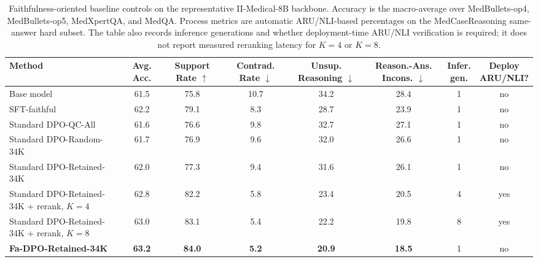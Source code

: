\documentclass[a4paper,fleqn,doubleblind]{cas-sc}
\begin{document}
\begin{table}[htbp]
    \centering
    \footnotesize
    \setlength{\tabcolsep}{3.2pt}
    \caption{Faithfulness-oriented baseline controls on the representative II-Medical-8B backbone. Accuracy is the macro-average over MedBullets-op4, MedBullets-op5, MedXpertQA, and MedQA. Process metrics are automatic ARU/NLI-based percentages on the MedCaseReasoning same-answer hard subset. The table also records inference generations and whether deployment-time ARU/NLI verification is required; it does not report measured reranking latency for $K=4$ or $K=8$.}
    \label{tab:faithfulness_baseline_results}
    \begin{adjustbox}{max width=\textwidth}
    \begin{tabular}{lccccccc}
        \toprule
        \textbf{Method} & \textbf{Avg. Acc.} & \shortstack[c]{\textbf{Support}\\\textbf{Rate $\uparrow$}} & \shortstack[c]{\textbf{Contrad.}\\\textbf{Rate $\downarrow$}} & \shortstack[c]{\textbf{Unsup.}\\\textbf{Reasoning $\downarrow$}} & \shortstack[c]{\textbf{Reason.-Ans.}\\\textbf{Incons. $\downarrow$}} & \shortstack[c]{\textbf{Infer.}\\\textbf{gen.}} & \shortstack[c]{\textbf{Deploy}\\\textbf{ARU/NLI?}} \\
        \midrule
        Base model & 61.5 & 75.8 & 10.7 & 34.2 & 28.4 & 1 & no \\
        SFT-faithful & 62.2 & 79.1 & 8.3 & 28.7 & 23.9 & 1 & no \\
        Standard DPO-QC-All & 61.6 & 76.6 & 9.8 & 32.7 & 27.1 & 1 & no \\
        Standard DPO-Random-34K & 61.7 & 76.9 & 9.6 & 32.0 & 26.6 & 1 & no \\
        Standard DPO-Retained-34K & 62.0 & 77.3 & 9.4 & 31.6 & 26.1 & 1 & no \\
        Standard DPO-Retained-34K + rerank, $K=4$ & 62.8 & 82.2 & 5.8 & 23.4 & 20.5 & 4 & yes \\
        Standard DPO-Retained-34K + rerank, $K=8$ & 63.0 & 83.1 & 5.4 & 22.2 & 19.8 & 8 & yes \\
        \textbf{Fa-DPO-Retained-34K} & \textbf{63.2} & \textbf{84.0} & \textbf{5.2} & \textbf{20.9} & \textbf{18.5} & 1 & no \\
        \bottomrule
    \end{tabular}
    \end{adjustbox}
\end{table}
\end{document}
